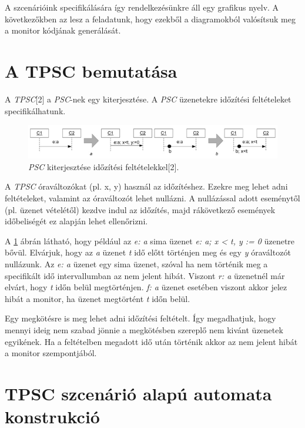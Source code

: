 A szcenárióink specifikálására így rendelkezésünkre áll egy grafikus nyelv.
A következőkben az lesz a feladatunk, hogy ezekből a diagramokból valósítsuk meg a monitor kódjának generálását.

\section{A TPSC bemutatása}
A \textit{TPSC}[2] a \textit{PSC}-nek egy kiterjesztése.
A \textit{PSC} üzenetekre időzítési feltételeket specifikálhatunk.

\begin{figure}[!ht]
    \centering
    \includegraphics[width=150mm, keepaspectratio]{figures/4abra.png}
    \caption{\textit{PSC} kiterjesztése időzítési feltételekkel[2].}
    \label{psc_clock_improvement}
\end{figure}

A \textit{TPSC} óraváltozókat (pl. x, y) használ az időzítéshez.
Ezekre meg lehet adni feltételeket, valamint az óraváltozót lehet nullázni.
A nullázással adott eseménytől (pl. üzenet vételétől) kezdve indul az időzítés, majd rákövetkező események időbeliségét ez alapján lehet ellenőrizni.

A \ref{psc_clock_improvement} ábrán látható, hogy például az \textit{e: a} sima üzenet \textit{e: a; x < t, y := 0} üzenetre bővül.
Elvárjuk, hogy az \textit{a} üzenet \textit{t} idő előtt történjen meg és egy \textit{y} óraváltozót nullázunk.
Az \textit{e: a} üzenet egy sima üzenet, szóval ha nem történik meg a specifikált idő intervallumban az nem jelent hibát.
Viszont \textit{r: a} üzenetnél már elvárt, hogy \textit{t} időn belül megtörténjen. \textit{f: a} üzenet esetében viszont akkor jelez hibát a monitor, ha üzenet megtörtént \textit{t} időn belül.

Egy megkötésre is meg lehet adni időzítési feltételt.
Így megadhatjuk, hogy mennyi ideig nem szabad jönnie a megkötésben szereplő nem kivánt üzenetek egyikének.
Ha a feltételben megadott idő után történik akkor az nem jelent hibát a monitor szempontjából.

\clearpage\section{TPSC szcenárió alapú automata konstrukció}

